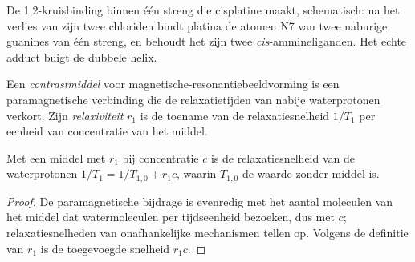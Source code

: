 \begin{omfigure}

{\small De 1,2-kruisbinding binnen één streng die cisplatine maakt,
schematisch: na het verlies van zijn twee chloriden bindt platina de
atomen N7 van twee naburige guanines van één streng, en behoudt het zijn
twee \textit{cis}-ammineliganden. Het echte adduct buigt de dubbele helix.}
\end{omfigure}

\begin{definition}[Contrastmiddelen]\label{def:b3:bioinorganic:contrast}
Een \emph{contrastmiddel} voor
magnetische-resonantiebeeldvorming is een paramagnetische verbinding die
de relaxatietijden van nabije waterprotonen verkort. Zijn
\emph{relaxiviteit} $r_1$ is de toename van de
relaxatiesnelheid $1/T_1$ per eenheid van concentratie van het middel.
\end{definition}

\begin{proposition}[Relaxatiesnelheid]\label{prop:b3:bioinorganic:relaxivity}
Met een middel met  $r_1$ bij concentratie $c$ is de relaxatiesnelheid van de
waterprotonen $1/T_1 = 1/T_{1,0} + r_1c$, waarin $T_{1,0}$ de waarde zonder middel is.
\end{proposition}

\begin{proof}
De paramagnetische bijdrage is evenredig met het aantal moleculen van
het middel dat watermoleculen per tijdseenheid bezoeken, dus met $c$;
relaxatiesnelheden van onafhankelijke mechanismen tellen op. Volgens de definitie van $r_1$ is de toegevoegde snelheid $r_1c$.
\end{proof}


